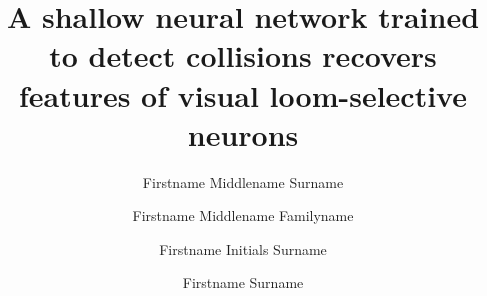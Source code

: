 \documentclass[pdftex,9pt,lineno]{elife}
\title{A shallow neural network trained to detect collisions recovers features of visual loom-selective neurons}
\author[1*]{Firstname Middlename Surname}
\author[1,2\authfn{1}\authfn{3}]{Firstname Middlename Familyname}
\author[2\authfn{1}\authfn{4}]{Firstname Initials Surname}
\author[2*]{Firstname Surname}
\affil[1]{Institution 1}
\affil[2]{Institution 2}
\begin{document}
\maketitle

\begin{abstract}

\end{abstract}
\end{document}
